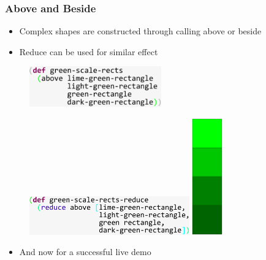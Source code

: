 \documentclass{beamer}
\begin{document}
\begin{frame}
\frametitle{Above and Beside}
	\begin{itemize}
		\item Complex shapes are constructed through calling above or beside
		\item Reduce can be used for similar effect
	\end{itemize}

	\begin{figure}
	\hspace{-4.3cm}
	\vspace{0.8cm}
		\includegraphics[width=5.7cm]{PresentationImages/greenScaleRects.pdf}
	\end{figure}
	\begin{figure}
	\vspace{-4.8cm}
		\includegraphics[width=6.9cm]{PresentationImages/greenScaleRectsReduce.pdf}
		\hspace{1.6cm}
		\includegraphics[width=1.3cm]{PresentationImages/greenScaleTower.pdf}
	\end{figure}

\end{frame}

\begin{frame}
	\begin{itemize}
		\item And now for a successful live demo
	\end{itemize}
\end{frame}
\end{document}
